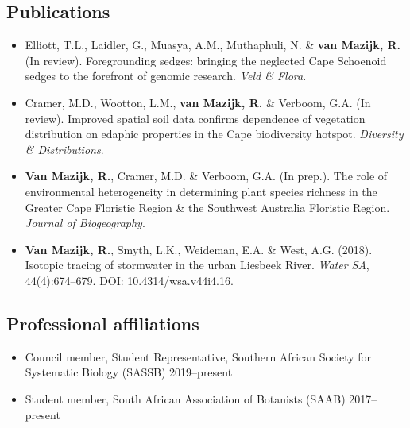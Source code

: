 \documentclass[10pt]{article}
\begin{document}
\subsection*{Publications}
\begin{itemize}[noitemsep, nolistsep]
\item Elliott, T.L., Laidler, G., Muasya, A.M., Muthaphuli, N. \& \textbf{van 
  Mazijk, R.} (In review). Foregrounding sedges: bringing the neglected Cape 
  Schoenoid sedges to the forefront of genomic research. \textit{Veld \& Flora}.
\item Cramer, M.D., Wootton, L.M., \textbf{van Mazijk, R.} \& Verboom, G.A. (In
  review). Improved spatial soil data confirms dependence of vegetation
  distribution on edaphic properties in the Cape biodiversity hotspot. \textit{
  Diversity \& Distributions}.
\item \textbf{Van Mazijk, R.}, Cramer, M.D. \& Verboom, G.A. (In prep.). The 
  role of environmental heterogeneity in determining plant species richness in 
  the Greater Cape Floristic Region \& the Southwest Australia Floristic 
  Region. \textit{Journal of Biogeography}.
\item \textbf{Van Mazijk, R.}, Smyth, L.K., Weideman, E.A. \& West, A.G. (2018).
  Isotopic tracing of stormwater in the urban Liesbeek River. \textit{Water SA},
  44(4):674--679. DOI: 10.4314/wsa.v44i4.16.
\end{itemize}

\subsection*{Professional affiliations}
\begin{itemize}[noitemsep, nolistsep]
\item Council member, Student Representative, Southern African Society for
  Systematic Biology (SASSB) \hfill 2019--present %
\item Student member, South African Association of Botanists (SAAB)
  \hfill 2017--present
\end{itemize}
\end{document}
